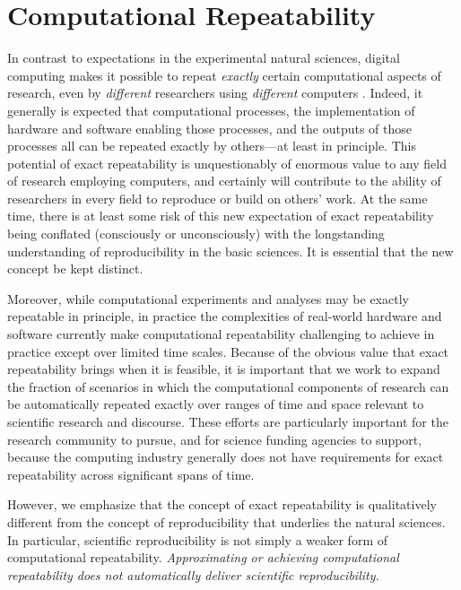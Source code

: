 \section{Computational Repeatability}\label{sec-repeatability}

In contrast to expectations in the experimental natural sciences, digital computing makes it 
	possible to repeat \emph{exactly} certain computational aspects of research, even by \emph{different} 
	researchers using \emph{different} computers \cite{donoho2010, peng2011, stodden2013a, stodden2013b, stodden2014a}.  
Indeed, it generally is expected that computational processes, the implementation of hardware and software 
	enabling those processes, and the outputs of those processes all can be repeated exactly by others---at least in principle.
This potential of exact repeatability is unquestionably of enormous value to any field of research employing computers,
	and certainly will contribute to the ability of researchers in every field to reproduce or build on others' work.
At the same time, there is at least some risk of this new expectation of exact repeatability being conflated 
	(consciously or unconsciously) with the longstanding understanding of reproducibility in the basic sciences. 
It is essential that the new concept be kept distinct.

Moreover, while computational experiments and analyses may be exactly repeatable in principle, 
	in practice the complexities of real-world hardware and software currently make computational repeatability 
	challenging to achieve in practice except over limited time scales.
Because of the obvious value that exact repeatability brings when it is feasible, it is important that we work to
	expand the fraction of scenarios in which the computational components of research can be automatically 
	repeated exactly over ranges of time and space relevant to scientific research and discourse.
These efforts are particularly important for the research community to pursue, and for science funding
	agencies to support, because the computing industry generally does not have requirements for exact 
	repeatability across significant spans of time.

However, we emphasize that the concept of exact repeatability is 
	qualitatively different from the concept of reproducibility that underlies the natural sciences.
In particular, scientific reproducibility is not simply a weaker form of computational repeatability.  
\emph{Approximating or achieving computational repeatability does not automatically deliver scientific reproducibility.}

